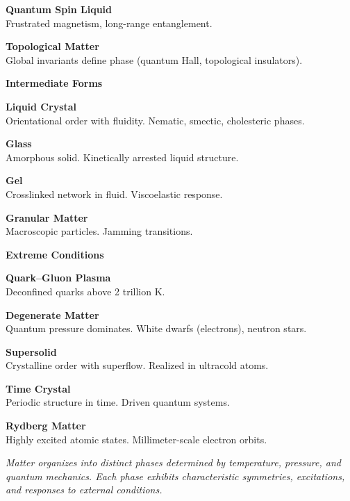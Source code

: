 \begin{center}
\begin{tcolorbox}
\begin{multicols}{2}
\textbf{Quantum Spin Liquid}\\
{\footnotesize Frustrated magnetism, long-range entanglement.}\vspace{4pt}

\textbf{Topological Matter}\\
{\footnotesize Global invariants define phase (quantum Hall, topological insulators).}

\columnbreak

\colorbox{blue!15}{\textbf{ Intermediate Forms}}\vspace{2pt}

\textbf{Liquid Crystal}\\
{\footnotesize Orientational order with fluidity. Nematic, smectic, cholesteric phases.}\vspace{4pt}

\textbf{Glass}\\
{\footnotesize Amorphous solid. Kinetically arrested liquid structure.}\vspace{4pt}

\textbf{Gel}\\
{\footnotesize Crosslinked network in fluid. Viscoelastic response.}\vspace{4pt}

\textbf{Granular Matter}\\
{\footnotesize Macroscopic particles. Jamming transitions.}\vspace{8pt}

\colorbox{blue!15}{\textbf{ Extreme Conditions}}\vspace{2pt}

\textbf{Quark–Gluon Plasma}\\
{\footnotesize Deconfined quarks above 2 trillion K.}\vspace{4pt}

\textbf{Degenerate Matter}\\
{\footnotesize Quantum pressure dominates. White dwarfs (electrons), neutron stars.}\vspace{4pt}

\textbf{Supersolid}\\
{\footnotesize Crystalline order with superflow. Realized in ultracold atoms.}\vspace{4pt}

\textbf{Time Crystal}\\
{\footnotesize Periodic structure in time. Driven quantum systems.}\vspace{4pt}

\textbf{Rydberg Matter}\\
{\footnotesize Highly excited atomic states. Millimeter-scale electron orbits.}

\end{multicols}

\vspace{6pt}
{\footnotesize\color{blue!70}\textit{Matter organizes into distinct phases determined by temperature, pressure, and quantum mechanics. Each phase exhibits characteristic symmetries, excitations, and responses to external conditions.}}

\end{tcolorbox}
\end{center}
    